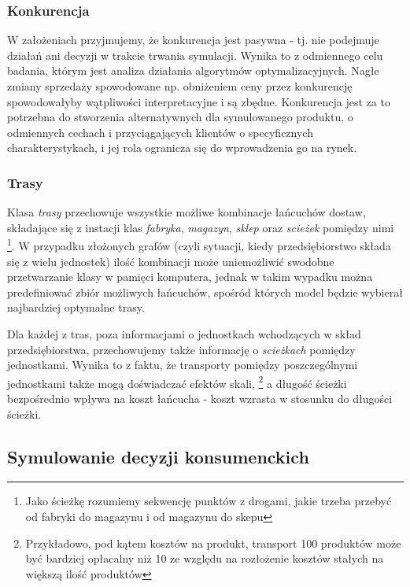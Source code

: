 \documentclass[polish, twoside, 12pt, a4paper]{article}
\theoremstyle{definition}
\theoremstyle{plain}
\theoremstyle{remark}
\begin{document}
\subsubsection{Konkurencja}
 
W założeniach przyjmujemy, że konkurencja jest pasywna - tj. nie podejmuje działań ani decyzji w trakcie trwania symulacji. Wynika to z odmiennego celu badania, którym jest analiza działania algorytmów optymalizacyjnych. Nagłe zmiany sprzedaży spowodowane np. obniżeniem ceny przez konkurencję spowodowałyby wątpliwości interpretacyjne i są zbędne. Konkurencja jest za to potrzebna do stworzenia alternatywnych dla symulowanego produktu, o odmiennych cechach i przyciągających klientów o specyficznych charakterystykach, i jej rola ogranicza się do wprowadzenia go na rynek.


\subsubsection{Trasy}

Klasa \textit{trasy} przechowuje wszystkie możliwe kombinacje łańcuchów dostaw, składające się z instacji klas \textit{fabryka}, \textit{magazyn}, \textit{sklep} oraz \textit{scieżek} pomiędzy nimi \footnote{Jako ścieżkę rozumiemy sekwencję punktów z drogami, jakie trzeba przebyć od fabryki do magazynu i od magazynu do skepu}. W przypadku złożonych grafów (czyli sytuacji, kiedy przedsiębiorstwo składa się z wielu jednostek) ilość kombinacji może uniemożliwić swodobne przetwarzanie klasy w pamięci komputera, jednak w takim wypadku można predefiniować zbiór możliwych łańcuchów, spośród których model będzie wybierał najbardziej optymalne trasy. 

Dla każdej z tras, poza informacjami o jednostkach wchodzących w skład przedsiębiorstwa, przechowujemy także informację o \textit{scieżkach} pomiędzy jednostkami. Wynika to z faktu, że transporty pomiędzy poszczególnymi jednostkami także mogą doświadczać efektów skali, \footnote{Przykładowo, pod kątem kosztów na produkt, transport 100 produktów może być bardziej opłacalny niż 10  ze względu na rozłożenie kosztów stałych na większą ilość produktów} a długość ścieżki bezpośrednio wpływa na koszt łańcucha - koszt wzrasta w stosunku do długości ścieżki.

\subsection{Symulowanie decyzji konsumenckich}
\end{document}
